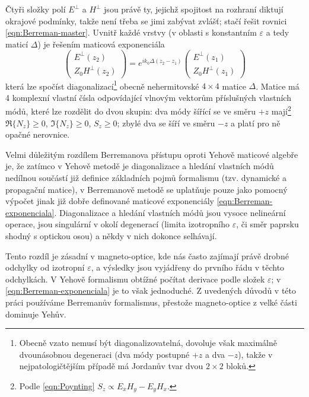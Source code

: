 Čtyři složky polí $E^\perp$ a $H^\perp$ jsou právě ty, jejichž spojitost na rozhraní diktují okrajové podmínky, takže není třeba se jimi zabývat zvlášť; stačí řešit rovnici \eqref{eqn:Berreman-master}.
Uvnitř každé vrstvy (v oblasti s konstantním $\varepsilon$ a tedy maticí $\Delta$) je řešením maticová exponenciála
\begin{equation}
\label{eqn:Berreman-exponenciala}
    \begin{pmatrix} E^\perp(z_2) \\ Z_0 H^\perp(z_2) \end{pmatrix} = e^{ik_0\Delta(z_2-z_1)} \begin{pmatrix} E^\perp(z_1) \\ Z_0 H^\perp(z_1) \end{pmatrix}
\end{equation}
která lze spočíst diagonalizací\footnote{Obecně vzato nemusí být diagonalizovatelná, dovoluje však maximálně dvounásobnou degeneraci (dva módy postupné $+z$ a dva $-z$), takže v nejpatologičtějším případě má Jordanův tvar dvou $2\times2$ bloků.} obecně nehermitovské $4\times 4$ matice $\Delta$.
Matice má 4 komplexní vlastní čísla odpovídající vlnovým vektorům příslušných vlastních módů, které lze rozdělit do dvou skupin:
dva módy šířící se ve směru $+z$ mají\footnote{Podle \eqref{eqn:Poynting} $S_z \propto E_xH_y-E_yH_x$.} $\Re\lbrace N_z \rbrace\geq0$, $\Im\lbrace N_z \rbrace\geq0$, $S_z\geq0$; zbylé dva se šíří ve směru $-z$ a platí pro ně opačné nerovnice.

Velmi důležitým rozdílem Berremanova přístupu oproti Yehově maticové algebře je,
že zatímco v Yehově metodě je diagonalizace a hledání vlastních módů nedílnou součástí již definice základních pojmů formalismu (tzv. dynamické a propagační matice),
v Berremanově metodě se uplatňuje pouze jako pomocný výpočet jinak již dobře definované maticové exponenciály \eqref{eqn:Berreman-exponenciala}.
Diagonalizace a hledání vlastních módů jsou vysoce nelineární operace, jsou singulární v okolí degenerací (limita izotropního $\varepsilon$, či směr paprsku shodný s optickou osou) a někdy v nich dokonce selhávají\cite{xuOpticalDegeneraciesAnisotropic2000,wuSingularitiesMatrixFormalisms2018,garibelloSingularityYehTransfer2020,bertrandGeneralAnalyticalTreatment2001}.

Tento rozdíl je zásadní v magneto-optice, kde nás často zajímají právě drobné odchylky od izotropní $\varepsilon$, a výsledky jsou vyjádřeny do prvního řádu v těchto odchylkách.
V Yehově formalismu obtížné počítat derivace podle složek $\varepsilon$; v \eqref{eqn:Berreman-exponenciala} je to však jednoduché\cite{bertrandGeneralAnalyticalTreatment2001}.
Z uvedených důvodů v této práci používáme Berremanův formalismus, přestože magneto-optice z velké části dominuje Yehův.


